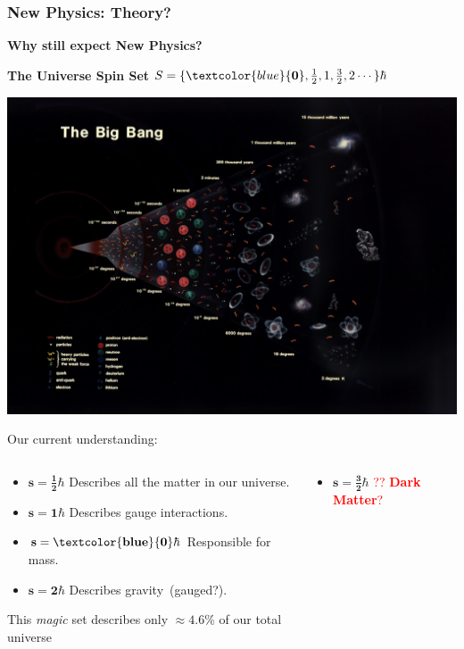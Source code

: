\documentclass{beamer}
\begin{document}
\begin{frame}
\frametitle{New Physics: Theory?}
\textbf{Why still expect New Physics?}
  \begin{minipage}[b]{0.75\linewidth}
    \begin{multicols}{2}
     \begin{varblock}[3.5cm]{\textbf{The Universe  Spin Set}}
     \huge{
       $S =\{\textcolor{blue}{\mathbf{0}}, \frac{1}{2}, 1,  \frac{3}{2}, 2  \cdots \} \hbar $ 
       }
     \end{varblock}
     \columnbreak
     \includegraphics[height=0.45\textwidth,width=0.40\paperwidth]{THESISPLOTS/New-Physics-PLOTS/Big_Bang.jpg}
 \end{multicols}
 \end{minipage}
\begin{minipage}[b]{\linewidth}
Our current understanding:
 \begin{columns}
    \begin{column}{0.65\linewidth} 
     \begin{itemize}
     \item $\mathbf{s = \frac{1}{2}\hbar}$ Describes all the matter in our universe.
     \item $\mathbf{s = 1\hbar}$ Describes gauge interactions.
     \item $\mathbf{s = \textcolor{blue}{0}\hbar}$ Responsible for mass.
     \item $\mathbf{s = 2\hbar}$ Describes gravity~(gauged?).
    \end{itemize}
    This \textit{magic} set describes  only $\approx 4.6$\% of our total universe
   \end{column}
     \begin{column}{0.35\linewidth}
      \begin{itemize}
       \item $\mathbf{s = \frac{3}{2}\hbar}$ \textcolor{red}{?? \textbf{Dark Matter}?}

\end{itemize}
\end{column}
\end{columns}
\end{minipage}
\end{frame}
\end{document}
